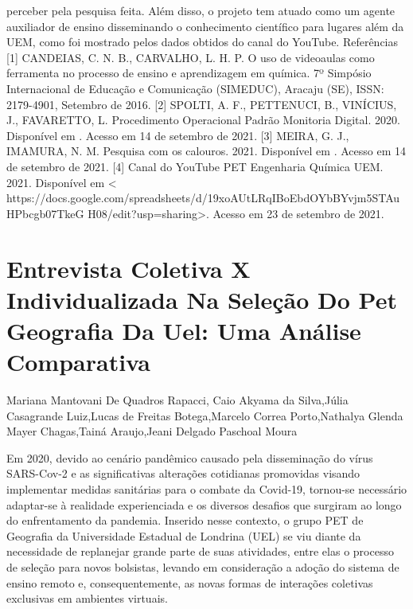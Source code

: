 perceber pela pesquisa feita. Além disso, o projeto tem atuado como um agente auxiliador de 
ensino disseminando o conhecimento científico para lugares além da UEM, como foi mostrado
pelos dados obtidos do canal do YouTube.
Referências 
[1] CANDEIAS, C. N. B., CARVALHO, L. H. P. O uso de videoaulas como ferramenta no 
processo de ensino e aprendizagem em química. 7º Simpósio Internacional de Educação e 
Comunicação (SIMEDUC), Aracaju (SE), ISSN: 2179-4901, Setembro de 2016.
[2] SPOLTI, A. F., PETTENUCI, B., VINÍCIUS, J., FAVARETTO, L. Procedimento 
Operacional Padrão Monitoria Digital. 2020. Disponível em . 
Acesso em 14 de setembro de 2021.
[3] MEIRA, G. J., IMAMURA, N. M. Pesquisa com os calouros. 2021. Disponível em
. Acesso em 14 de setembro de 2021. 
[4] Canal do YouTube PET Engenharia Química UEM. 2021. Disponível em <
https://docs.google.com/spreadsheets/d/19xoAUtLRqIBoEbdOYbBYvjm5STAuHPbcgb07TkeG
H08/edit?usp=sharing>. Acesso em 23 de setembro de 2021.




\section*{Entrevista Coletiva X Individualizada Na Seleção Do Pet Geografia Da Uel: Uma Análise Comparativa}

Mariana Mantovani De Quadros Rapacci, Caio Akyama da Silva,Júlia Casagrande Luiz,Lucas de Freitas Botega,Marcelo Correa Porto,Nathalya Glenda Mayer Chagas,Tainá Araujo,Jeani Delgado Paschoal Moura

Em 2020, devido ao cenário pandêmico causado pela disseminação do vírus SARS-Cov-2 e as significativas alterações cotidianas promovidas visando implementar medidas sanitárias para o combate da Covid-19, tornou-se necessário adaptar-se à realidade experienciada e os diversos desafios que surgiram ao longo do enfrentamento da pandemia. Inserido nesse contexto, o grupo PET de Geografia da Universidade Estadual de Londrina (UEL) se viu diante da necessidade de replanejar grande parte de suas atividades, entre elas o processo de seleção para novos bolsistas, levando em consideração a adoção do sistema de ensino remoto e, consequentemente, as novas formas de interações coletivas exclusivas em ambientes virtuais.

